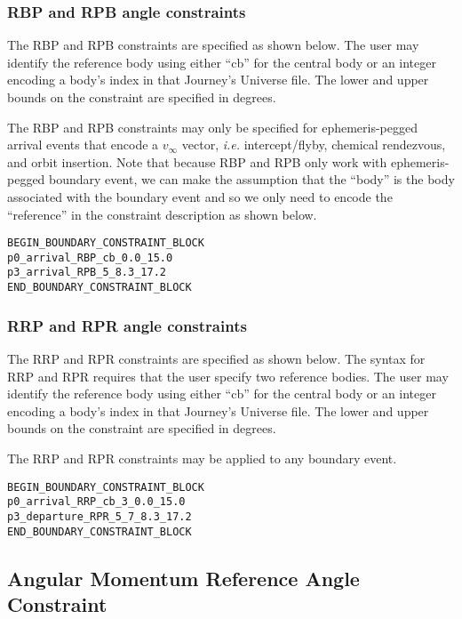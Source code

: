 \documentclass[11pt]{article}
\begin{document}
\subsubsection{RBP and RPB angle constraints}
\label{subsubsec:RBP_and_RPB}

The RBP and RPB constraints are specified as shown below. The user may identify the reference body using either ``cb'' for the central body or an integer encoding a body's index in that Journey's Universe file. The lower and upper bounds on the constraint are specified in degrees.

The RBP and RPB constraints may only be specified for ephemeris-pegged arrival events that encode a $v_\infty$ vector, \textit{i.e.} intercept/flyby, chemical rendezvous, and orbit insertion. Note that because RBP and RPB only work with ephemeris-pegged boundary event, we can make the assumption that the ``body'' is the body associated with the boundary event and so we only need to encode the ``reference'' in the constraint description as shown below.

\begin{verbatim}
BEGIN_BOUNDARY_CONSTRAINT_BLOCK
p0_arrival_RBP_cb_0.0_15.0
p3_arrival_RPB_5_8.3_17.2
END_BOUNDARY_CONSTRAINT_BLOCK
\end{verbatim}


\subsubsection{RRP and RPR angle constraints}
\label{subsubsec:RRP_and_RP}

The RRP and RPR constraints are specified as shown below. The syntax for RRP and RPR requires that the user specify two reference bodies. The user may identify the reference body using either ``cb'' for the central body or an integer encoding a body's index in that Journey's Universe file. The lower and upper bounds on the constraint are specified in degrees.

The RRP and RPR constraints may be applied to any boundary event.

\begin{verbatim}
BEGIN_BOUNDARY_CONSTRAINT_BLOCK
p0_arrival_RRP_cb_3_0.0_15.0
p3_departure_RPR_5_7_8.3_17.2
END_BOUNDARY_CONSTRAINT_BLOCK
\end{verbatim}

\subsection{Angular Momentum Reference Angle Constraint}
\label{subsec:angular_momentum_reference_angle}
\end{document}
